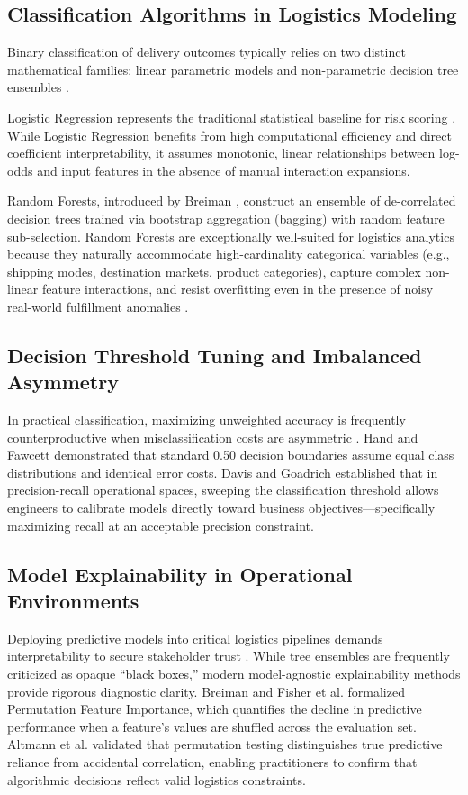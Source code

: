 \documentclass[journal,10pt,twocolumn]{IEEEtran}
\begin{document}
\subsection{Classification Algorithms in Logistics Modeling}
Binary classification of delivery outcomes typically relies on two distinct mathematical families: linear parametric models and non-parametric decision tree ensembles \cite{hastie2009elements}.

Logistic Regression represents the traditional statistical baseline for risk scoring \cite{hosmer2013applied}. While Logistic Regression benefits from high computational efficiency and direct coefficient interpretability, it assumes monotonic, linear relationships between log-odds and input features in the absence of manual interaction expansions.

Random Forests, introduced by Breiman \cite{breiman2001random}, construct an ensemble of de-correlated decision trees trained via bootstrap aggregation (bagging) with random feature sub-selection. Random Forests are exceptionally well-suited for logistics analytics because they naturally accommodate high-cardinality categorical variables (e.g., shipping modes, destination markets, product categories), capture complex non-linear feature interactions, and resist overfitting even in the presence of noisy real-world fulfillment anomalies \cite{kuhn2013applied}.

\subsection{Decision Threshold Tuning and Imbalanced Asymmetry}
In practical classification, maximizing unweighted accuracy is frequently counterproductive when misclassification costs are asymmetric \cite{provost2001robust}. Hand \cite{hand2009measuring} and Fawcett \cite{fawcett2006introduction} demonstrated that standard 0.50 decision boundaries assume equal class distributions and identical error costs. Davis and Goadrich \cite{davis2006relationship} established that in precision-recall operational spaces, sweeping the classification threshold allows engineers to calibrate models directly toward business objectives---specifically maximizing recall at an acceptable precision constraint.

\subsection{Model Explainability in Operational Environments}
Deploying predictive models into critical logistics pipelines demands interpretability to secure stakeholder trust \cite{ribeiro2016why}. While tree ensembles are frequently criticized as opaque ``black boxes,'' modern model-agnostic explainability methods provide rigorous diagnostic clarity. Breiman \cite{breiman2001random} and Fisher et al. \cite{fisher2019all} formalized Permutation Feature Importance, which quantifies the decline in predictive performance when a feature's values are shuffled across the evaluation set. Altmann et al. \cite{altmann2010permutation} validated that permutation testing distinguishes true predictive reliance from accidental correlation, enabling practitioners to confirm that algorithmic decisions reflect valid logistics constraints.
\end{document}
